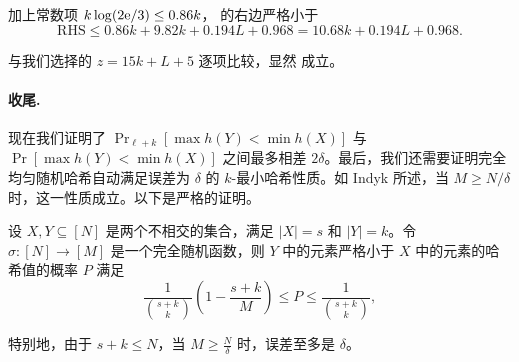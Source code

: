 加上常数项 $k \log(2 \mathrm{e}/3) \le 0.86 k$， 的右边严格小于
$$
\text{RHS} \le 0.86 k + 9.82 k + 0.194 L + 0.968 = 10.68 k + 0.194 L + 0.968.
$$

与我们选择的 $z = 15 k + L + 5$ 逐项比较，显然  成立。

\paragraph{收尾.}

现在我们证明了 $\Pr_{\ell + k}[\max h(Y) < \min h(X)]$ 与 $\Pr[\max h(Y) < \min h(X)]$ 之间最多相差 $2 \delta$。最后，我们还需要证明完全均匀随机哈希自动满足误差为 $\delta$ 的 $k$-最小哈希性质。如 Indyk \cite{minwise_Indyk} 所述，当 $M \ge N / \delta$ 时，这一性质成立。以下是严格的证明。

\begin{lemma}\label{lem:k_min_wise_full_random}
    设 $X, Y \subseteq [N]$ 是两个不相交的集合，满足 $|X| = s$ 和 $|Y| = k$。令 $\sigma: [N] \to [M]$ 是一个完全随机函数，则 $Y$ 中的元素严格小于 $X$ 中的元素的哈希值的概率 $P$ 满足
    $$
    \frac{1}{\binom{s + k}{k}} \left( 1 - \frac{s + k}{M} \right) \le P \le \frac{1}{\binom{s+k}{k}},
    $$
    
    特别地，由于 $s + k \le N$，当 $M \ge \frac{N}{\delta}$ 时，误差至多是 $\delta$。
\end{lemma}

